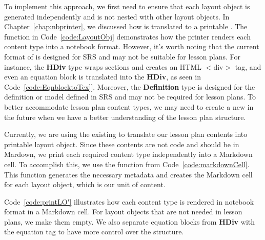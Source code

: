 To implement this approach, we first need to ensure that each layout object 
is generated independently and is not nested with other layout objects. In 
Chapter~\ref{chap:nbprinter}, we discussed how  is 
translated to a printable . The  function in 
Code~\ref{code:LayoutObj} demonstrates how the printer renders each content 
type into a notebook format. However, it's worth noting that the current format 
of  is designed for SRS and may not be suitable for lesson 
plans. For instance, the \textbf{HDiv} type wraps sections and creates an HTML 
$<$div$>$ tag, and even an equation block is translated into the \textbf{HDiv}, 
as seen in Code~\ref{code:EqnblocktoTex]}. Moreover, the \textbf{Definition} 
type is designed for the definition or model defined in SRS and may not be 
required for lesson plans. To better accommodate lesson plan content types, we 
may need to create a new  in the future when we have a 
better understanding of the lesson plan structure. 

Currently, we are using the existing  to translate our 
lesson plan contents into printable layout object. Since these contents are not 
code and should be in Mardown, we print each required content type 
independently into a Markdown cell. To accomplish this, we use the 
 function from Code~\ref{code:markdownCell}. This function 
generates the necessary metadata and creates the Markdown cell for each layout 
object, which is our unit of content. 

Code~\ref{code:printLO'} illustrates how each content type is rendered in 
notebook format in a Markdown cell. For layout objects that are not needed in 
lesson plans, we make them empty. We also separate equation blocks from 
\textbf{HDiv} with the equation tag to have more control over the structure.

